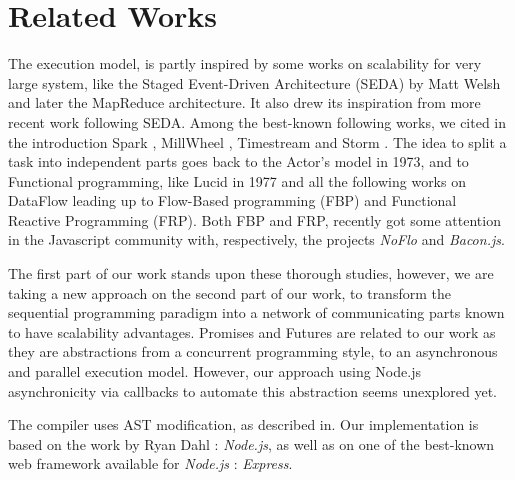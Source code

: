 \section{Related Works} \label{section:related}

The execution model, is partly inspired by some works on scalability for very large system, like the Staged Event-Driven Architecture (SEDA) by Matt Welsh\cite{Welsh2000} and later the MapReduce architecture\cite{Dean2008}.
It also drew its inspiration from more recent work following SEDA.
Among the best-known following works, we cited in the introduction Spark \cite{Zaharia2010}, MillWheel \cite{Akidau2013}, Timestream \cite{Qian2013} and Storm \cite{Marz2011}.
The idea to split a task into independent parts goes back to the Actor's model\cite{Hewitt1973} in 1973, and to Functional programming, like Lucid\cite{Ashcroft1977} in 1977 and all the following works on DataFlow leading up to Flow-Based programming (FBP)\cite{Morrison1994a} and Functional Reactive Programming (FRP)\cite{Elliott1997}.
Both FBP and FRP, recently got some attention in the Javascript community with, respectively, the projects \textit{NoFlo}\cite{NoFlo} and \textit{Bacon.js}\cite{Paananen2012}.

The first part of our work stands upon these thorough studies, however, we are taking a new approach on the second part of our work, to transform the sequential programming paradigm into a network of communicating parts known to have scalability advantages.
Promises\cite{Liskov1988} and Futures are related to our work as they are abstractions from a concurrent programming style, to an asynchronous and parallel execution model.
However, our approach using Node.js asynchronicity via callbacks to automate this abstraction seems unexplored yet.

The compiler uses AST modification, as described in\cite{Jones2003}.
Our implementation is based on the work by Ryan Dahl : \textit{Node.js}\cite{Dahl}, as well as on one of the best-known web framework available for \textit{Node.js} : \textit{Express}\cite{express}.